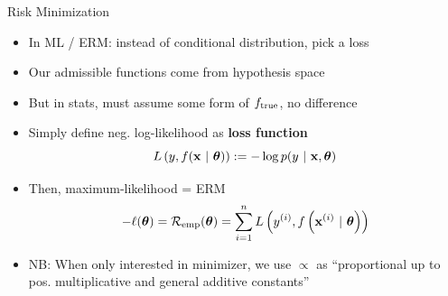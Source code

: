\documentclass[11pt,compress,t,notes=noshow, xcolor=table]{beamer}
\begin{document}
\begin{vbframe}{Risk Minimization} 

\begin{itemize}
\item In ML / ERM: instead of conditional distribution, pick a loss 
\item Our admissible functions come from hypothesis space 
\item But in stats, must assume some form of $f_{\text{true}}$, no difference

\item Simply define neg. log-likelihood as \textbf{loss function} 
$$ L\left(y, f(\mathbf{x} ~|~ \bm{\theta})\right) := - \log p(y ~|~\mathbf{x}, \bm{\theta}) $$
\item Then, maximum-likelihood 
 = ERM
$$- \ell(\bm{\theta}) = \mathcal{R}_{\text{emp}}(\bm{\theta}) = \sum\limits_{i=1}^n L\left(y^{(i)}, f\left(\mathbf{x}^{(i)} ~|~ \bm{\theta}\right)\right)$$

\item NB: When only interested in minimizer, we use $\propto$ as \enquote{proportional up to pos. multiplicative and general additive constants}

\end{itemize}

\end{vbframe}
\end{document}
